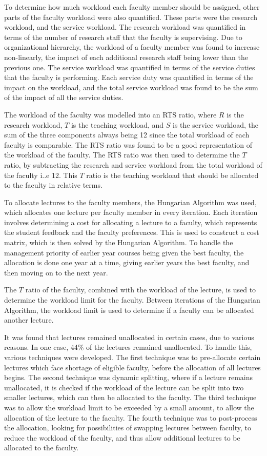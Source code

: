 To determine how much workload each faculty member should be assigned, other parts of the faculty workload were also quantified. These parts were the research workload, and the service workload. The research workload was quantified in terms of the number of research staff that the faculty is supervising. Due to organizational hierarchy, the workload of a faculty member was found to increase non-linearly, the impact of each additional research staff being lower than the previous one. The service workload was quantified in terms of the service duties that the faculty is performing. Each service duty was quantified in terms of the impact on the workload, and the total service workload was found to be the sum of the impact of all the service duties.

The workload of the faculty was modelled into an RTS ratio, where $R$ is the research workload, $T$ is the teaching workload, and $S$ is the service workload, the sum of the three components always being 12 since the total workload of each faculty is comparable. The RTS ratio was found to be a good representation of the workload of the faculty. The RTS ratio was then used to determine the $T$ ratio, by subtracting the research and service workload from the total workload of the faculty i..e 12. This $T$ ratio is the teaching workload that should be allocated to the faculty in relative terms.

To allocate lectures to the faculty members, the Hungarian Algorithm was used, which allocates one lecture per faculty member in every iteration. Each iteration involves determining a cost for allocating a lecture to a faculty, which represents the student feedback and the faculty preferences. This is used to construct a cost matrix, which is then solved by the Hungarian Algorithm. To handle the management priority of earlier year courses being given the best faculty, the allocation is done one year at a time, giving earlier years the best faculty, and then moving on to the next year.

The $T$ ratio of the faculty, combined with the workload of the lecture, is used to determine the workload limit for the faculty. Between iterations of the Hungarian Algorithm, the workload limit is used to determine if a faculty can be allocated another lecture.

It was found that lectures remained unallocated in certain cases, due to various reasons. In one case, 44\% of the lectures remained unallocated. To handle this, various techniques were developed. The first technique was to pre-allocate certain lectures which face shortage of eligible faculty, before the allocation of all lectures begins. The second technique was dynamic splitting, where if a lecture remains unallocated, it is checked if the workload of the lecture can be split into two smaller lectures, which can then be allocated to the faculty. The third technique was to allow the workload limit to be exceeded by a small amount, to allow the allocation of the lecture to the faculty. The fourth technique was to post-process the allocation, looking for possibilities of swapping lectures between faculty, to reduce the workload of the faculty, and thus allow additional lectures to be allocated to the faculty.

